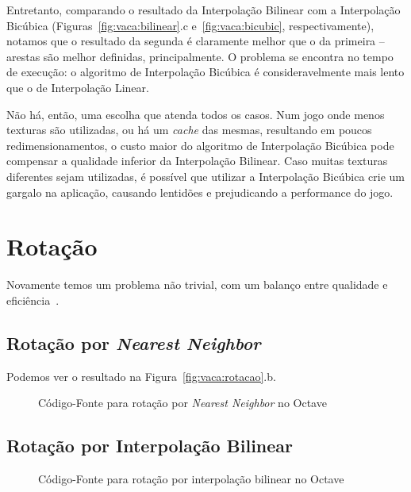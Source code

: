 \documentclass[12pt]{article}
\begin{document}
Entretanto, comparando o resultado da Interpolação Bilinear com a Interpolação Bicúbica (Figuras~\ref{fig:vaca:bilinear}.c e~\ref{fig:vaca:bicubic}, respectivamente), notamos que o resultado da segunda é claramente melhor que o da primeira -- arestas são melhor definidas, principalmente. O problema se encontra no tempo de execução: o algoritmo de Interpolação Bicúbica é consideravelmente mais lento que o de Interpolação Linear.

Não há, então, uma escolha que atenda todos os casos. Num jogo onde menos texturas são utilizadas, ou há um \emph{cache} das mesmas, resultando em poucos redimensionamentos, o custo maior do algoritmo de Interpolação Bicúbica pode compensar a qualidade inferior da Interpolação Bilinear. Caso muitas texturas diferentes sejam utilizadas, é possível que utilizar a Interpolação Bicúbica crie um gargalo na aplica\c{c}ão, causando lentidões e prejudicando a performance do jogo.

\section{Rotação}\label{sec:rotacao}

Novamente temos um problema não trivial, com um balanço entre qualidade e eficiência~\cite{kopf:2011}.
\subsection{Rotação por \textit{Nearest Neighbor}}\label{sec:rotacao:nearest}

Podemos ver o resultado na Figura~\ref{fig:vaca:rotacao}.b.

\begin{figure}[H]

\caption{Código-Fonte para rotação por \textit{Nearest Neighbor} no Octave}
\label{lst:rotate:nearest}
\end{figure}

\subsection{Rotação por Interpolação Bilinear}\label{sec:rotacao:bilinear}

\begin{figure}[H]

\caption{Código-Fonte para rotação por interpolação bilinear no Octave}
\label{lst:rotate:bilinear}
\end{figure}
\end{document}
